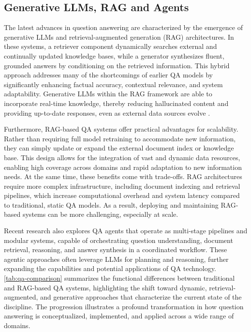 \begin{spacing}{1.5}
\section{Generative LLMs, RAG and Agents}

The latest advances in question answering are characterized by the emergence of generative LLMs and retrieval-augmented generation (RAG) architectures. In these systems, a retriever component dynamically searches external and continually updated knowledge bases, while a generator synthesizes fluent, grounded answers by conditioning on the retrieved information. This hybrid approach addresses many of the shortcomings of earlier QA models by significantly enhancing factual accuracy, contextual relevance, and system adaptability. Generative LLMs within the RAG framework are able to incorporate real-time knowledge, thereby reducing hallucinated content and providing up-to-date responses, even as external data sources evolve \citep{yue_survey_2025,lewis_retrieval-augmented_2020}. 

Furthermore, RAG-based QA systems offer practical advantages for scalability. Rather than requiring full model retraining to accommodate new information, they can simply update or expand the external document index or knowledge base. This design allows for the integration of vast and dynamic data resources, enabling high coverage across domains and rapid adaptation to new information needs. At the same time, these benefits come with trade-offs. RAG architectures require more complex infrastructure, including document indexing and retrieval pipelines, which increase computational overhead and system latency compared to traditional, static QA models. As a result, deploying and maintaining RAG-based systems can be more challenging, especially at scale.

Recent research also explores QA agents that operate as multi-stage pipelines and modular systems, capable of orchestrating question understanding, document retrieval, reasoning, and answer synthesis in a coordinated workflow. These agentic approaches often leverage LLMs for planning and reasoning, further expanding the capabilities and potential applications of QA technology.
\\


\autoref{tab:qa-comparison} summarizes the functional differences between traditional and RAG-based QA systems, highlighting the shift toward dynamic, retrieval-augmented, and generative approaches that characterize the current state of the discipline. The progression illustrates a profound transformation in how question answering is conceptualized, implemented, and applied across a wide range of domains.


\end{spacing}
